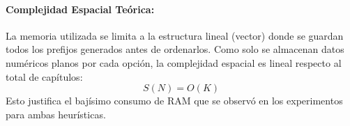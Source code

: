 \paragraph{Complejidad Espacial Teórica:}
La memoria utilizada se limita a la estructura lineal (vector) donde se guardan todos los prefijos generados antes de ordenarlos. Como solo se almacenan datos numéricos planos por cada opción, la complejidad espacial es lineal respecto al total de capítulos:
\begin{equation}
S(N) = O(K)
\end{equation}
Esto justifica el bajísimo consumo de RAM que se observó en los experimentos para ambas heurísticas.